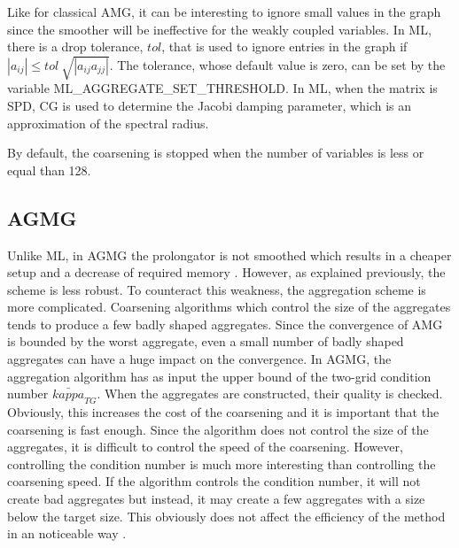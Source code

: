 Like for classical AMG, it can be interesting to ignore small values in
the graph since the smoother will be ineffective for the weakly coupled
variables. In ML, there is a drop tolerance, $tol$, that is used to ignore
entries in the graph if $|a_{ij}| \leq tol\ \sqrt{|a_{ij} a_{jj}|}$. The
tolerance, whose default value is zero, can be set by the variable 
ML\_AGGREGATE\_SET\_THRESHOLD.  In ML, when the matrix is SPD, CG is used 
to determine the Jacobi damping parameter, which is an approximation of 
the spectral radius.

By default, the coarsening is stopped when the number of variables is less 
or equal than 128.

\subsection{AGMG}
Unlike ML, in AGMG the prolongator is not smoothed which results in a
cheaper setup and a decrease of required memory \cite{agmg2}. However, as
explained previously, the scheme is less robust. To counteract this weakness, 
the aggregation scheme is more complicated. Coarsening algorithms which control
the size of the aggregates tends to produce a few badly shaped aggregates.
Since the convergence of AMG is bounded by the worst aggregate, even a small 
number of badly shaped aggregates can have a huge impact on the convergence. 
In AGMG, the aggregation algorithm has as input the upper bound of the 
two-grid condition number $\bar{kappa}_{TG}$. When the aggregates are constructed,
their quality is checked. Obviously, this increases the cost of the coarsening
and it is important that the coarsening is fast enough. Since the algorithm 
does not control the size of the aggregates, it is difficult to control the 
speed of the coarsening. However, controlling the condition number is much 
more interesting than controlling the coarsening speed. If the algorithm 
controls the condition number, it will not create bad aggregates but instead, it 
may create a few aggregates with a size below the target size. This obviously 
does not affect the efficiency of the method in an noticeable way \cite{agmg2}. 

